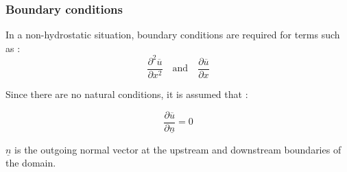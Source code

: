 \subsubsection{Boundary conditions}

In a non-hydrostatic situation, boundary conditions are required for terms such as :
$$\frac{\partial^2 \overline{u}}{\partial x^2}\quad\mbox{and}\quad\frac{\partial \overline{u}}{\partial x}$$

Since there are no natural conditions, it is assumed that :

$$\frac{\partial \overline{u}}{\partial \underline{n}} = 0$$

$\underline{n}$ is the outgoing normal vector at the upstream and downstream boundaries of the domain.

